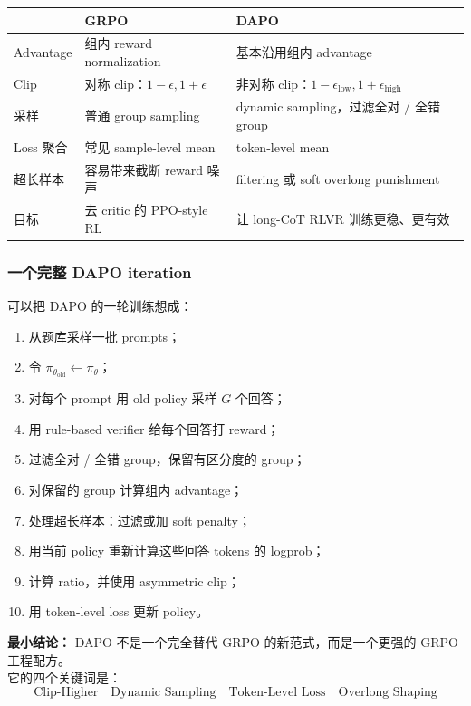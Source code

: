 \begin{center}
{\small
\begin{tabular}{p{3.2cm}p{4.7cm}p{4.9cm}}
\hline
 & \textbf{GRPO} & \textbf{DAPO} \\
\hline
Advantage
&
组内 reward normalization
&
基本沿用组内 advantage
\\
Clip
&
对称 clip：$1-\epsilon,1+\epsilon$
&
非对称 clip：$1-\epsilon_\text{low},1+\epsilon_\text{high}$
\\
采样
&
普通 group sampling
&
dynamic sampling，过滤全对 / 全错 group
\\
Loss 聚合
&
常见 sample-level mean
&
token-level mean
\\
超长样本
&
容易带来截断 reward 噪声
&
filtering 或 soft overlong punishment
\\
目标
&
去 critic 的 PPO-style RL
&
让 long-CoT RLVR 训练更稳、更有效
\\
\hline
\end{tabular}
}
\end{center}

\subsubsection{一个完整 DAPO iteration}

可以把 DAPO 的一轮训练想成：

\begin{enumerate}[leftmargin=1.5em]
  \item 从题库采样一批 prompts；
  \item 令 $\pi_{\theta_\text{old}} \leftarrow \pi_\theta$；
  \item 对每个 prompt 用 old policy 采样 $G$ 个回答；
  \item 用 rule-based verifier 给每个回答打 reward；
  \item 过滤全对 / 全错 group，保留有区分度的 group；
  \item 对保留的 group 计算组内 advantage；
  \item 处理超长样本：过滤或加 soft penalty；
  \item 用当前 policy 重新计算这些回答 tokens 的 logprob；
  \item 计算 ratio，并使用 asymmetric clip；
  \item 用 token-level loss 更新 policy。
\end{enumerate}

\begin{summarybox}
\textbf{最小结论：} DAPO 不是一个完全替代 GRPO 的新范式，而是一个更强的 GRPO 工程配方。\\
它的四个关键词是：
\[
\text{Clip-Higher}
\quad
\text{Dynamic Sampling}
\quad
\text{Token-Level Loss}
\quad
\text{Overlong Shaping}
\]
\end{summarybox}

